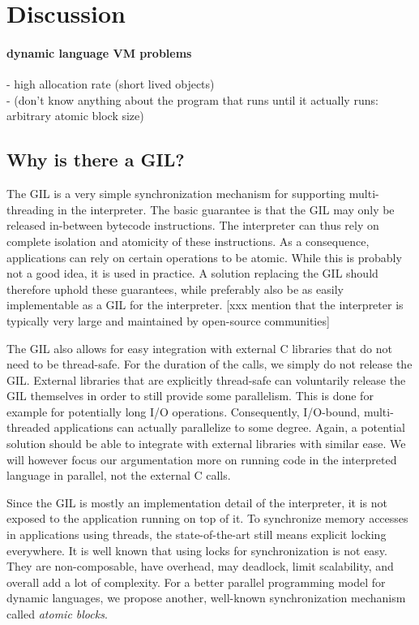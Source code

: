 \documentclass{sigplanconf}
\begin{document}
\section{Discussion}

\paragraph{dynamic language VM problems}

- high allocation rate (short lived objects)\\
- (don't know anything about the program that runs until it actually runs: arbitrary atomic block size)


\subsection{Why is there a GIL?}
The GIL is a very simple synchronization mechanism for supporting
multi-threading in the interpreter. The basic guarantee is that the
GIL may only be released in-between bytecode instructions. The
interpreter can thus rely on complete isolation and atomicity of these
instructions. As a consequence, applications can rely on certain
operations to be atomic. While this is probably not a good idea,
it is used in practice. A solution replacing the GIL should therefore
uphold these guarantees, while preferably also be as easily
implementable as a GIL for the interpreter.
[xxx mention that the interpreter is typically very large and maintained
by open-source communities]

The GIL also allows for easy integration with external C libraries that
do not need to be thread-safe. For the duration of the calls, we
simply do not release the GIL. External libraries that are explicitly
thread-safe can voluntarily release the GIL themselves in order to
still provide some parallelism. This is done for example for
potentially long I/O operations. Consequently, I/O-bound,
multi-threaded applications can actually parallelize to some
degree. Again, a potential solution should be able to integrate with
external libraries with similar ease. We will however focus our
argumentation more on running code in the interpreted language in
parallel, not the external C calls.

Since the GIL is mostly an implementation detail of the interpreter,
it is not exposed to the application running on top of it. To
synchronize memory accesses in applications using threads, the
state-of-the-art still means explicit locking everywhere. It is well
known that using locks for synchronization is not easy.  They are
non-composable, have overhead, may deadlock, limit scalability, and
overall add a lot of complexity. For a better parallel programming
model for dynamic languages, we propose another, well-known
synchronization mechanism called \emph{atomic blocks}.
\end{document}
